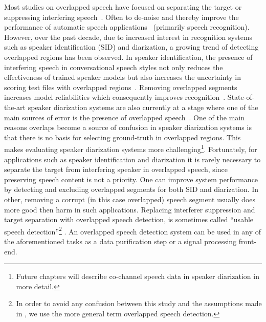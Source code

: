 Most studies on overlapped speech have focused on separating the target or suppressing interfering speech~\cite{morgan_cochannel}. 
Often to de-noise and thereby improve the performance of automatic speech applications~\cite{Quat_Dan_cch_sup,Chazan_93,cooke20101} (primarily speech recognition). 
However, over the past decade, due to increased interest in recognition systems such as speaker identification (SID) and diarization, a growing trend of detecting overlapped regions has been observed. 
In speaker identification, the presence of interfering speech in conversational speech styles not only reduces the effectiveness of trained speaker models but also increases the uncertainty in scoring test files with overlapped regions~\cite{yantorno_report}. 
Removing overlapped segments increases model reliabilities which consequently improves recognition~\cite{shokouhi2015}.    
State-of-the-art speaker diarization systems are also currently at a stage where one of the main sources of error is the presence of overlapped speech~\cite{boakye_icassp_08,zelenak12Trans}. 
One of the main reasons overlaps become a source of confusion in speaker diarization systems is that there is no basis for selecting ground-truth in overlapped regions. 
This makes evaluating speaker diarization systems more challenging\footnote{Future chapters will describe co-channel speech data in speaker diarization in more detail.}. 
Fortunately, for applications such as speaker identification and diarization it is rarely necessary to separate the target from interfering speaker in overlapped speech, since preserving speech content is not a priority. 
One can improve system performance by detecting and excluding overlapped segments for both SID and diarization. 
In other, removing a corrupt (in this case overlapped) speech segment usually does more good then harm in such applications. 
Replacing interferer suppression and target separation with overlapped speech detection, is sometimes called ``usable speech detection''\footnote{In order to avoid any confusion between this study and the assumptions made in \cite{yantorno_report}, we use the more general term overlapped speech detection.} \cite{yantorno_report}. 
An overlapped speech detection system can be used in any of the aforementioned tasks as a data purification step or a signal processing front-end. 


